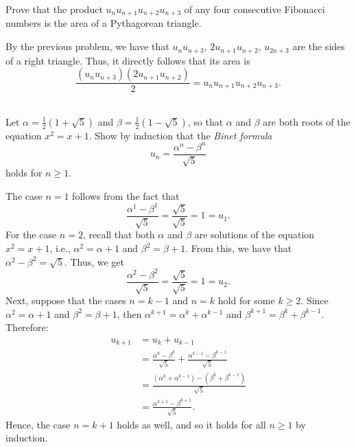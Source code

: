 \begin{exercise}
    Prove that the product $u_nu_{n+1}u_{n+2}u_{n+3}$ of any four consecutive Fibonacci numbers is the area of a Pythagorean triangle.  \\
\end{exercise}

\begin{solution}
    By the previous problem, we have that $u_nu_{n+3}$, $2u_{n+1}u_{n+2}$, $u_{2n+3}$ are the sides of a right triangle. Thus, it directly follows that its area is 
    $$\frac{(u_nu_{n+3})(2u_{n+1}u_{n+2})}{2} = u_nu_{n+1}u_{n+2}u_{n+3}.$$ \\
\end{solution}

\begin{exercise}
    Let $\alpha = \frac{1}{2}(1+ \sqrt{5})$ and $\beta = \frac{1}{2}(1 - \sqrt{5})$, so that $\alpha$ and $\beta$ are both roots of the equation $x^2 = x + 1$. Show by induction that the \textit{Binet formula}
    $$u_n = \frac{\alpha^n - \beta^n}{\sqrt{5}}$$
    holds for $n \geq 1$. \\
\end{exercise}

\begin{solution}
    The case $n = 1$ follows from the fact that 
    $$\frac{\alpha^1 - \beta^1}{\sqrt{5}} = \frac{\sqrt{5}}{\sqrt{5}} = 1 = u_1.$$
    For the case $n = 2$, recall that both $\alpha$ and $\beta$ are solutions of the equation $x^2 = x + 1$, i.e., $\alpha^2 = \alpha + 1$ and $\beta^2 = \beta + 1$. From this, we have that $\alpha^2 - \beta^2 = \sqrt{5}$. Thus, we get 
    $$\frac{\alpha^2 - \beta^2}{\sqrt{5}} = \frac{\sqrt{5}}{\sqrt{5}} = 1 = u_2.$$
    Next, suppose that the cases $n = k-1$ and $n = k$ hold for some $k \geq 2$. Since $\alpha^2 = \alpha + 1$ and $\beta^2 = \beta + 1$, then $\alpha^{k+1} = \alpha^k + \alpha^{k-1}$ and $\beta^{k+1} = \beta^k + \beta^{k-1}$. Therefore:
    \begin{align*}
        u_{k+1} &= u_k + u_{k-1} \\
        &= \frac{\alpha^k - \beta^k}{\sqrt{5}} + \frac{\alpha^{k-1} - \beta^{k-1}}{\sqrt{5}} \\
        &= \frac{(\alpha^k + \alpha^{k-1}) - (\beta^k + \beta^{k-1})}{\sqrt{5}} \\
        &= \frac{\alpha^{k+1} - \beta^{k+1}}{\sqrt{5}}.
    \end{align*}
    Hence, the case $n = k+1$ holds as well, and so it holds for all $n \geq 1$ by induction. \\
\end{solution}

